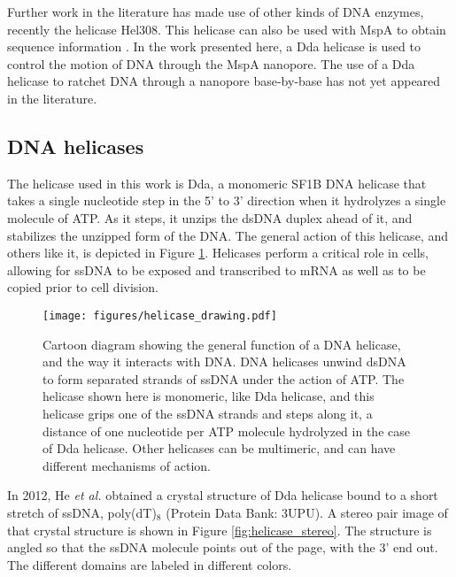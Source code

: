 Further work in the literature has made use of other kinds of DNA enzymes, recently the helicase Hel308.  This helicase can also be used with MspA to obtain sequence information \citep{Derrington2015}.  In the work presented here, a Dda helicase is used to control the motion of DNA through the MspA nanopore.  The use of a Dda helicase to ratchet DNA through a nanopore base-by-base has not yet appeared in the literature.

\subsection{DNA helicases}

The helicase used in this work is Dda, a monomeric SF1B DNA helicase that takes a single nucleotide step in the 5' to 3' direction when it hydrolyzes a single molecule of ATP.  As it steps, it unzips the dsDNA duplex ahead of it, and stabilizes the unzipped form of the DNA.  The general action of this helicase, and others like it, is depicted in Figure \ref{fig:helicase_drawing}.  Helicases perform a critical role in cells, allowing for ssDNA to be exposed and transcribed to mRNA as well as to be copied prior to cell division.

\begin{figure}[h]
\begin{centering}
\texttt{[image: figures/helicase\_drawing.pdf]}
\caption[DNA helicase general function]{Cartoon diagram showing the general function of a DNA helicase, and the way it interacts with DNA.  DNA helicases unwind dsDNA to form separated strands of ssDNA under the action of ATP.  The helicase shown here is monomeric, like Dda helicase, and this helicase grips one of the ssDNA strands and steps along it, a distance of one nucleotide per ATP molecule hydrolyzed in the case of Dda helicase.  Other helicases can be multimeric, and can have different mechanisms of action.}
\label{fig:helicase_drawing}
\end{centering}
\end{figure}

In 2012, He \textit{et al.} \citep{He2012} obtained a crystal structure of Dda helicase bound to a short stretch of ssDNA, poly(dT)$_8$ (Protein Data Bank: 3UPU).  A stereo pair image of that crystal structure is shown in Figure \ref{fig:helicase_stereo}.  The structure is angled so that the ssDNA molecule points out of the page, with the 3' end out.  The different domains are labeled in different colors.

